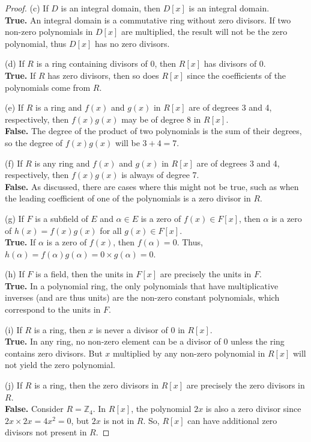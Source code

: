 \documentclass[12pt]{amsart}
\theoremstyle{definition}
\numberwithin{equation}{section}
\theoremstyle{plain}
\newcommand{\Z}{\mathbb{Z}}
\begin{document}
\begin{exercise}{23}
\begin{proof}
    (c) If \( D \) is an integral domain, then \( D[x] \) is an integral domain.\\
    \textbf{True.} An integral domain is a commutative ring without zero divisors. If two non-zero polynomials in \( D[x] \) are multiplied, the result will not be the zero polynomial, thus \( D[x] \) has no zero divisors.
    
    (d) If \( R \) is a ring containing divisors of \( 0 \), then \( R[x] \) has divisors of \( 0 \).\\
    \textbf{True.} If \( R \) has zero divisors, then so does \( R[x] \) since the coefficients of the polynomials come from \( R \).
    
    (e) If \( R \) is a ring and \( f(x) \) and \( g(x) \) in \( R[x] \) are of degrees 3 and 4, respectively, then \( f(x)g(x) \) may be of degree 8 in \( R[x] \).\\
    \textbf{False.} The degree of the product of two polynomials is the sum of their degrees, so the degree of \( f(x)g(x) \) will be \( 3 + 4 = 7 \).
    
    (f) If \( R \) is any ring and \( f(x) \) and \( g(x) \) in \( R[x] \) are of degrees 3 and 4, respectively, then \( f(x)g(x) \) is always of degree 7.\\
    \textbf{False.} As discussed, there are cases where this might not be true, such as when the leading coefficient of one of the polynomials is a zero divisor in \( R \).
    
    (g) If \( F \) is a subfield of \( E \) and \( \alpha \in E \) is a zero of \( f(x) \in F[x] \), then \( \alpha \) is a zero of \( h(x) = f(x)g(x) \) for all \( g(x) \in F[x] \).\\
    \textbf{True.} If \( \alpha \) is a zero of \( f(x) \), then \( f(\alpha) = 0 \). Thus, \( h(\alpha) = f(\alpha)g(\alpha) = 0 \times g(\alpha) = 0 \).
    
    (h) If \( F \) is a field, then the units in \( F[x] \) are precisely the units in \( F \).\\
    \textbf{True.} In a polynomial ring, the only polynomials that have multiplicative inverses (and are thus units) are the non-zero constant polynomials, which correspond to the units in \( F \).
    
    (i) If \( R \) is a ring, then \( x \) is never a divisor of \( 0 \) in \( R[x] \).\\
    \textbf{True.} In any ring, no non-zero element can be a divisor of 0 unless the ring contains zero divisors. But \( x \) multiplied by any non-zero polynomial in \( R[x] \) will not yield the zero polynomial.
    
    (j) If \( R \) is a ring, then the zero divisors in \( R[x] \) are precisely the zero divisors in \( R \).\\
    \textbf{False.} Consider \( R = \Z_4 \). In \( R[x] \), the polynomial \( 2x \) is also a zero divisor since \( 2x \times 2x = 4x^2 = 0 \), but \( 2x \) is not in \( R \). So, \( R[x] \) can have additional zero divisors not present in \( R \).
    \end{proof}
\end{exercise}
\end{document}
